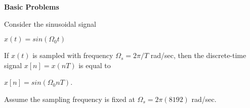 \begin{LARGE}
  \textbf{Basic Problems}
\end{LARGE}

\hspace*{\fill}

Consider the sinusoidal signal 

\begin{center}
$x(t) = sin(\Omega_0 t)$
\end{center}

If $x(t)$ is sampled with frequency $\Omega_s = 2\pi/T$ rad/sec, then the discrete-time signal $x[n] = x(nT)$ is equal to

\begin{center}
$x[n] = sin(\Omega_0 nT)$.
\end{center}

Assume the sampling frequency is fixed at $\Omega_s = 2\pi(8192)$ rad/sec.
